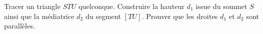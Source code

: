 
\begin{exercice}\label{exosmath-0916}

    Tracer un triangle \( STU\) quelconque. Construire la hauteur \( d_1\) issue du sommet \( S\) ainsi que la médiatrice \( d_2\) du segment \( [TU]\). Prouver que les droites \( d_1\) et \( d_2\) sont parallèles.

\end{exercice}
